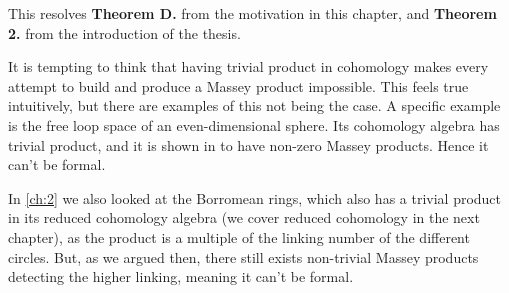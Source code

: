 This resolves \textbf{Theorem D.} from the motivation in this chapter, and \textbf{Theorem 2.} from the introduction of the thesis. 

It is tempting to think that having trivial product in cohomology makes every attempt to build and produce a Massey product impossible. This feels true intuitively, but there are examples of this not being the case. A specific example is the free loop space of an even-dimensional sphere. Its cohomology algebra has trivial product, and it is shown in \cite[Theorem 3.5]{nonformal_loop} to have non-zero Massey products. Hence it can't be formal. 

In \cref{ch:2} we also looked at the Borromean rings, which also has a trivial product in its reduced cohomology algebra (we cover reduced cohomology in the next chapter), as the product is a multiple of the linking number of the different circles. But, as we argued then, there still exists non-trivial Massey products detecting the higher linking, meaning it can't be formal. 



